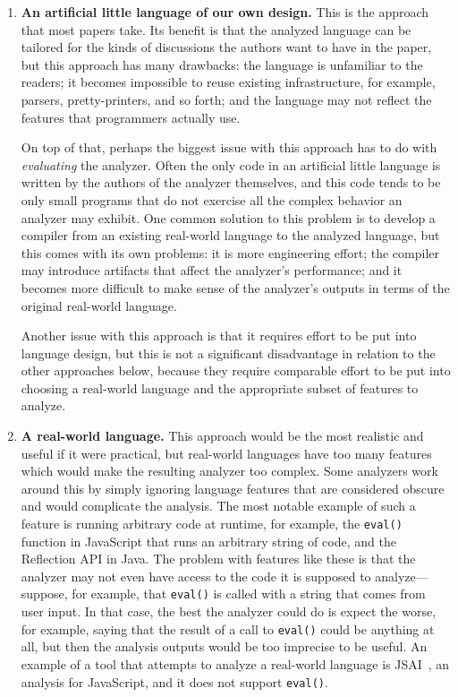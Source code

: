 \documentclass[12pt, oneside]{book}
\begin{document}
\begin{enumerate}
\item \textbf{An artificial little language of our own design.} This is the approach that most papers take. Its benefit is that the analyzed language can be tailored for the kinds of discussions the authors want to have in the paper, but this approach has many drawbacks: the language is unfamiliar to the readers; it becomes impossible to reuse existing infrastructure, for example, parsers, pretty-printers, and so forth; and the language may not reflect the features that programmers actually use.

On top of that, perhaps the biggest issue with this approach has to do with \emph{evaluating} the analyzer. Often the only code in an artificial little language is written by the authors of the analyzer themselves, and this code tends to be only small programs that do not exercise all the complex behavior an analyzer may exhibit. One common solution to this problem is to develop a compiler from an existing real-world language to the analyzed language, but this comes with its own problems: it is more engineering effort; the compiler may introduce artifacts that affect the analyzer’s performance; and it becomes more difficult to make sense of the analyzer’s outputs in terms of the original real-world language.

Another issue with this approach is that it requires effort to be put into language design, but this is not a significant disadvantage in relation to the other approaches below, because they require comparable effort to be put into choosing a real-world language and the appropriate subset of features to analyze.

\item \textbf{A real-world language.} This approach would be the most realistic and useful if it were practical, but real-world languages have too many features which would make the resulting analyzer too complex. Some analyzers work around this by simply ignoring language features that are considered obscure and would complicate the analysis. The most notable example of such a feature is running arbitrary code at runtime, for example, the \texttt{eval()} function in JavaScript that runs an arbitrary string of code, and the Reflection API in Java. The problem with features like these is that the analyzer may not even have access to the code it is supposed to analyze—suppose, for example, that \texttt{eval()} is called with a string that comes from user input. In that case, the best the analyzer could do is expect the worse, for example, saying that the result of a call to \texttt{eval()} could be anything at all, but then the analysis outputs would be too imprecise to be useful. An example of a tool that attempts to analyze a real-world language is JSAI~\cite{jsai}, an analysis for JavaScript, and it does not support \texttt{eval()}.


\end{enumerate}
\end{document}
